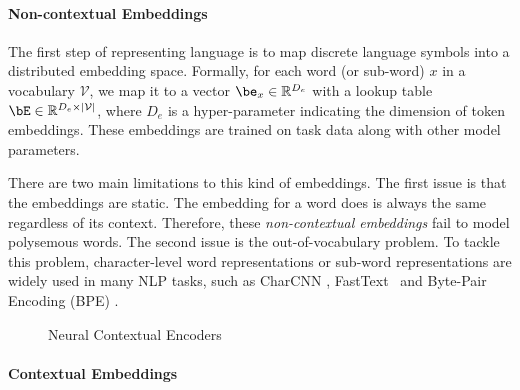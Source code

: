 \documentclass[fleqn]{SCYE-arxiv}
\begin{document}
\begin{multicols}{2}
\paragraph{Non-contextual Embeddings}

The first step of representing language is to map discrete language symbols into a distributed embedding space. Formally, for each word (or sub-word) $x$ in a vocabulary $\mathcal{V}$, we map it to a vector $\be_{x} \in \mathbb{R}^{D_e}$ with a lookup table $\bE \in \mathbb{R}^{D_e \times |\mathcal{V}|}$, where $D_e$ is a hyper-parameter indicating the dimension of token embeddings. These embeddings are trained on task data along with other model parameters.

There are two main limitations to this kind of embeddings. The first issue is that the embeddings are static. The embedding for a word does is always the same regardless of its context. Therefore, these \textit{non-contextual embeddings} fail to model polysemous words.
The second issue is the out-of-vocabulary problem. To tackle this problem, character-level word representations or sub-word representations are widely used in many NLP tasks, such as CharCNN \cite{kim2016character}, FastText~\cite{DBLP:journals/tacl/BojanowskiGJM17} and Byte-Pair Encoding (BPE) \cite{DBLP:conf/acl/SennrichHB16a}.


\begin{figure*}[t]
  \centering
{}
\hspace{2em}
\hspace{2em}
  \caption{Neural Contextual Encoders}
  \label{fig:neural-encoders}
\end{figure*}

\paragraph{Contextual Embeddings}


\end{multicols}
\end{document}
